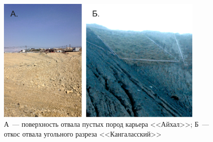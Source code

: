 \begin{figure}
  \begin{center}
    \includegraphics[width=0.9\textwidth]{authors/nekiforov-fig1.jpg}
  \end{center}
  \caption{А~--- поверхность отвала пустых пород карьера <<Айхал>>; Б~--- откос отвала угольного разреза <<Кангаласский>>}
  \label{fig:nekiforov-fig1}
\end{figure}
